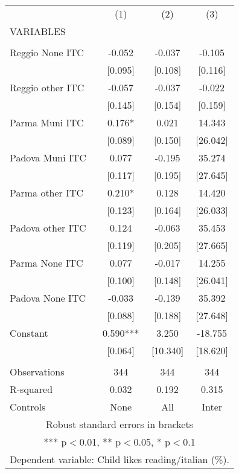 \begin{tabular}{lccc} \hline
 & (1) & (2) & (3) \\
VARIABLES &  &  &  \\ \hline
 &  &  &  \\
Reggio None ITC & -0.052 & -0.037 & -0.105 \\
 & [0.095] & [0.108] & [0.116] \\
Reggio other ITC & -0.057 & -0.037 & -0.022 \\
 & [0.145] & [0.154] & [0.159] \\
Parma Muni ITC & 0.176* & 0.021 & 14.343 \\
 & [0.089] & [0.150] & [26.042] \\
Padova Muni ITC & 0.077 & -0.195 & 35.274 \\
 & [0.117] & [0.195] & [27.645] \\
Parma other ITC & 0.210* & 0.128 & 14.420 \\
 & [0.123] & [0.164] & [26.033] \\
Padova other ITC & 0.124 & -0.063 & 35.453 \\
 & [0.119] & [0.205] & [27.665] \\
Parma None ITC & 0.077 & -0.017 & 14.255 \\
 & [0.100] & [0.148] & [26.041] \\
Padova None ITC & -0.033 & -0.139 & 35.392 \\
 & [0.088] & [0.188] & [27.648] \\
Constant & 0.590*** & 3.250 & -18.755 \\
 & [0.064] & [10.340] & [18.620] \\
 &  &  &  \\
Observations & 344 & 344 & 344 \\
R-squared & 0.032 & 0.192 & 0.315 \\
 Controls & None & All & Inter \\ \hline
\multicolumn{4}{c}{ Robust standard errors in brackets} \\
\multicolumn{4}{c}{ *** p$<$0.01, ** p$<$0.05, * p$<$0.1} \\
\multicolumn{4}{c}{ Dependent variable: Child likes reading/italian (\%).} \\
\end{tabular}
